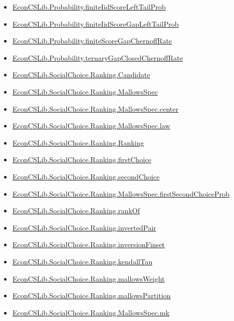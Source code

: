 \documentclass[10pt]{article}
\begin{document}
\begin{itemize}[leftmargin=1.2em]
\begin{itemize}[leftmargin=1.2em]
\item \hyperlink{library-prerequisite-a47c2aeffd3648c8}{EconCSLib.Probability.finiteIidScoreLeftTailProb}
\item \hyperlink{library-prerequisite-2e87694dda96c244}{EconCSLib.Probability.finiteIidScoreGapLeftTailProb}
\item \hyperlink{library-prerequisite-805935835e8976b4}{EconCSLib.Probability.finiteScoreGapChernoffRate}
\item \hyperlink{library-prerequisite-74718d0e5993a8d2}{EconCSLib.Probability.ternaryGapClosedChernoffRate}
\item \hyperlink{library-prerequisite-dfa732ba2fb3e45a}{EconCSLib.SocialChoice.Ranking.Candidate}
\item \hyperlink{library-prerequisite-c6f7a311d73d7f96}{EconCSLib.SocialChoice.Ranking.MallowsSpec}
\item \hyperlink{library-prerequisite-0cca0893d970d536}{EconCSLib.SocialChoice.Ranking.MallowsSpec.center}
\item \hyperlink{library-prerequisite-ba2261cd134f7593}{EconCSLib.SocialChoice.Ranking.MallowsSpec.law}
\item \hyperlink{library-prerequisite-8f403b33d88960b7}{EconCSLib.SocialChoice.Ranking.Ranking}
\item \hyperlink{library-prerequisite-7b06b37dd64e13d0}{EconCSLib.SocialChoice.Ranking.firstChoice}
\item \hyperlink{library-prerequisite-2f14612a40825584}{EconCSLib.SocialChoice.Ranking.secondChoice}
\item \hyperlink{library-prerequisite-9c2b583129e6297a}{EconCSLib.SocialChoice.Ranking.MallowsSpec.firstSecondChoiceProb}
\item \hyperlink{library-prerequisite-ffa701659b5a9425}{EconCSLib.SocialChoice.Ranking.rankOf}
\item \hyperlink{library-prerequisite-3b92294c8958cd6a}{EconCSLib.SocialChoice.Ranking.invertedPair}
\item \hyperlink{library-prerequisite-0bcb643e4e8f308c}{EconCSLib.SocialChoice.Ranking.inversionFinset}
\item \hyperlink{library-prerequisite-bba935eca4d406d8}{EconCSLib.SocialChoice.Ranking.kendallTau}
\item \hyperlink{library-prerequisite-edc3a87dc9a381a1}{EconCSLib.SocialChoice.Ranking.mallowsWeight}
\item \hyperlink{library-prerequisite-8607325b51c61bb5}{EconCSLib.SocialChoice.Ranking.mallowsPartition}
\item \hyperlink{library-prerequisite-b97465b53542a645}{EconCSLib.SocialChoice.Ranking.MallowsSpec.mk}

\end{itemize}
\end{itemize}
\end{document}
